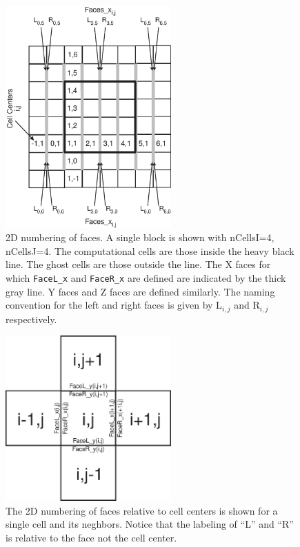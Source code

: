 \begin{figure}
\begin{center}
\includegraphics*[width=2.5in]{faces.eps}
\end{center}
\caption{2D numbering of faces.  A single block is shown with nCellsI=4, nCellsJ=4.
The computational cells are those inside the heavy black line.  The ghost cells are those
outside the line.  The X faces for which {\tt FaceL\_x} and {\tt FaceR\_x} are defined
are indicated by the thick gray line.  Y faces and Z faces
are defined similarly.  The naming convention for the left and right faces is given by 
L$_{i,j}$ and R$_{i,j}$ respectively.}
\label{fig:faces1}
\end{figure}
\begin{figure}
\begin{center}
\includegraphics*[width=2.5in]{face_numbering.eps}
\end{center}
\caption{The 2D numbering of faces relative to cell centers 
is shown for a single cell and its 
neghbors.  Notice that the labeling of ``L'' and ``R'' is relative to the face not
the cell center.}  
\label{fig:faces2}
\end{figure}

